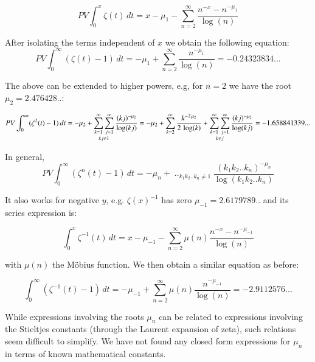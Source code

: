 \documentclass[a4paper,11pt,twoside]{amsart}
\begin{document}
\begin{equation}\label{zetPV2}
  PV \int_0^x \zeta(t)\, dt = x - \mu_1 - \sum_{n=2}^{\infty} \frac{n^{-x}-n^{-\mu_1}}{\log(n)}
\end{equation}

After isolating the terms independent of $x$ we obtain the following equation:
\begin{equation}\label{zetPV3}
  PV \int_0^{\infty} (\zeta(t) - 1) \,dt = -\mu_1+\sum_{n=2}^{\infty} \frac{n^{-\mu_1}}{\log(n)}=-0.24323834...
\end{equation}

The above can be extended to higher powers, e.g, for $n=2$ we have the root $\mu_{2} = 2.476428..$:

\begin{equation}\label{zetPV4}
 PV \int_0^{\infty} (\zeta^{2}(t) - 1) \,dt = -\mu_{2} + \mathop{\sum_{k=1}^{\infty}\sum_{j=1}^{\infty}}_{kj \ne 1} \frac{(kj)^{-\mu_{2}}}{\log(kj)}\\
= -\mu_{2}+\sum_{k=2}^{\infty} \frac{k^{-2\,\mu_{2}}}{2\,\log(k)} + \mathop{\sum_{k=1}^{\infty}\sum_{j=1}^{\infty}}_{k \ne j} \frac{(kj)^{-\mu_{2}}}{\log(kj)} = -1.658841339... 
\end{equation}

In general, 
\begin{equation}\label{zetPV5}
 PV \int_0^{\infty} (\zeta^{n}(t) - 1) \,dt = -\mu_{n} + \mathop{\sum_{k_{1}=1}^{\infty}\sum_{k_{2}=1}^{\infty}..\sum_{k_{n}=1}^{\infty}}_{k_{1}k_{2}..k_{n} \ne 1} \frac{(k_{1}k_{2}..k_{n})^{-\mu_{n}}}{\log(k_{1}k_{2}..k_{n})}
\end{equation}

It also works for negative $y$, e.g. $\zeta(x)^{-1}$ has zero $\mu_{-1} = 2.6179789..$ and its series expression is:

\begin{equation}\label{zetPV6}
 \int_0^x \zeta^{-1}(t)\, dt = x- \mu_{-1} - \sum_{n=2}^{\infty} \mu(n)\frac{n^{-x}-n^{-\mu_{-1}}}{\log(n)}
\end{equation}

with $\mu(n)$ the Möbius function. We then obtain a similar equation as before:

\begin{equation}\label{zetPV7}
  \int_0^{\infty} (\zeta^{-1}(t) -1) \,dt = -\mu_{-1}+\sum_{n=2}^{\infty} \mu(n)\frac{n^{-\mu_{-1}}}{\log(n)} = -2.9112576...
\end{equation}

While expressions involving the roots $\mu_n$ can be related to expressions involving the Stieltjes constants (through the Laurent expansion of zeta), such relations seem difficult to simplify. We have not found any closed form expressions for $\mu_n$ in terms of known mathematical constants.
\end{document}
